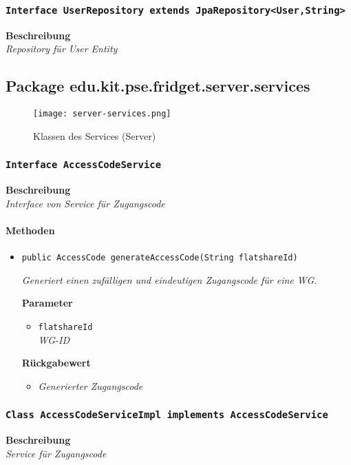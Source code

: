      \subsubsection{\texttt{Interface UserRepository extends JpaRepository<User,String>}}
     \textbf{Beschreibung} \\
     \textit{Repository für User Entity}
     \subsection{Package edu.kit.pse.fridget.server.services}
     \begin{figure}[H]
	       \centering
	       \texttt{[image: server-services.png]}
	       \caption{Klassen des Services (Server)}
	      \end{figure}
     \subsubsection{\texttt{Interface AccessCodeService}}
     \textbf{Beschreibung} \\
     \textit{Interface von Service für Zugangscode}
     \paragraph*{Methoden}
     \begin{itemize}
     	\item{\texttt{public AccessCode generateAccessCode(String flatshareId)}}
     	
     	\textit{Generiert einen zufälligen und eindeutigen Zugangscode für eine WG.}
     	
     	\textbf{Parameter}
     	\begin{itemize}
     		\item\texttt{flatshareId}\\
     		\textit{WG-ID}
     	\end{itemize}
     
     	\textbf{Rückgabewert}
     	\begin{itemize}
     		\item\textit{Generierter Zugangscode}
     	\end{itemize}
     \end{itemize}
     \subsubsection{\texttt{Class AccessCodeServiceImpl implements AccessCodeService}}
     \textbf{Beschreibung} \\
     \textit{Service für Zugangscode}
